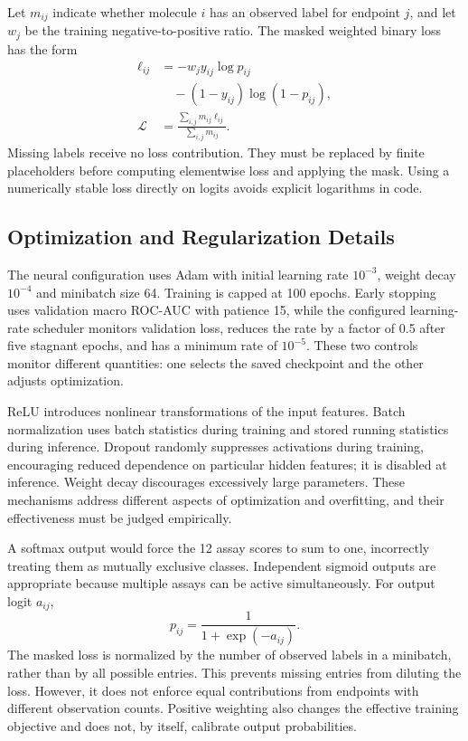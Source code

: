 \documentclass[11pt,a4paper]{article}\usepackage[margin=25mm]{geometry}\usepackage{fancyhdr}\usepackage{setspace}\usepackage{titlesec}\usepackage{xcolor}
\begin{document}
Let $m_{ij}$ indicate whether molecule $i$ has an observed label for endpoint $j$, and let $w_j$ be the training negative-to-positive ratio. The masked weighted binary loss has the form
\begin{align}
\ell_{ij} &= -w_jy_{ij}\log p_{ij} \\
&\quad -(1-y_{ij})\log(1-p_{ij}),\nonumber\\
\mathcal{L} &= \frac{\sum_{i,j}m_{ij}\ell_{ij}}{\sum_{i,j}m_{ij}}.
\end{align}
Missing labels receive no loss contribution. They must be replaced by finite placeholders before computing elementwise loss and applying the mask. Using a numerically stable loss directly on logits avoids explicit logarithms in code.


\subsection{Optimization and Regularization Details}
The neural configuration uses Adam with initial learning rate $10^{-3}$, weight decay $10^{-4}$ and minibatch size 64. Training is capped at 100 epochs. Early stopping uses validation macro ROC-AUC with patience 15, while the configured learning-rate scheduler monitors validation loss, reduces the rate by a factor of 0.5 after five stagnant epochs, and has a minimum rate of $10^{-5}$. These two controls monitor different quantities: one selects the saved checkpoint and the other adjusts optimization.

ReLU introduces nonlinear transformations of the input features. Batch normalization uses batch statistics during training and stored running statistics during inference. Dropout randomly suppresses activations during training, encouraging reduced dependence on particular hidden features; it is disabled at inference. Weight decay discourages excessively large parameters. These mechanisms address different aspects of optimization and overfitting, and their effectiveness must be judged empirically.

A softmax output would force the 12 assay scores to sum to one, incorrectly treating them as mutually exclusive classes. Independent sigmoid outputs are appropriate because multiple assays can be active simultaneously. For output logit $a_{ij}$,
\begin{equation}
p_{ij}=\frac{1}{1+\exp(-a_{ij})}.
\end{equation}
The masked loss is normalized by the number of observed labels in a minibatch, rather than by all possible entries. This prevents missing entries from diluting the loss. However, it does not enforce equal contributions from endpoints with different observation counts. Positive weighting also changes the effective training objective and does not, by itself, calibrate output probabilities.
\end{document}
